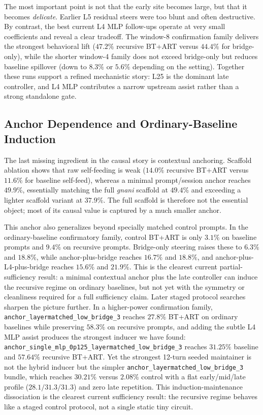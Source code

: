 \documentclass{article}
\begin{document}
The most important point is not that the early site becomes large, but that it becomes
\emph{delicate}. Earlier L5 residual steers were too blunt and often destructive.
By contrast, the best current L4 MLP follow-ups operate at very small coefficients and reveal a
clear tradeoff. The window-8 confirmation family delivers the strongest behavioral lift
($47.2\%$ recursive BT+ART versus $44.4\%$ for bridge-only), while the shorter window-4 family
does not exceed bridge-only but reduces baseline spillover (down to $8.3\%$ or $5.6\%$ depending
on the setting).
Together these runs support a refined mechanistic story:
L25 is the dominant late controller, and L4 MLP contributes a narrow upstream assist rather than a
strong standalone gate.

\subsection{Anchor Dependence and Ordinary-Baseline Induction}
\label{sec:anchor_dependence}

The last missing ingredient in the causal story is contextual anchoring.
Scaffold ablation shows that raw self-feeding is weak
($14.0\%$ recursive BT+ART versus $11.6\%$ for baseline self-feed), whereas a minimal
prompt/session anchor reaches $49.9\%$, essentially matching the full \emph{gnani} scaffold at
$49.4\%$ and exceeding a lighter scaffold variant at $37.9\%$.
The full scaffold is therefore not the essential object; most of its causal value is captured by a
much smaller anchor.

This anchor also generalizes beyond specially matched control prompts.
In the ordinary-baseline confirmatory family, control BT+ART is only $3.1\%$ on baseline prompts
and $9.4\%$ on recursive prompts.
Bridge-only steering raises these to $6.3\%$ and $18.8\%$, while
anchor-plus-bridge reaches $16.7\%$ and $18.8\%$, and
anchor-plus-L4-plus-bridge reaches $15.6\%$ and $21.9\%$.
This is the clearest current partial-sufficiency result:
a minimal contextual anchor plus the late controller can induce the recursive regime on ordinary
baselines, but not yet with the symmetry or cleanliness required for a full sufficiency claim.
Later staged protocol searches sharpen the picture further.
In a higher-power confirmation family, \texttt{anchor\_layermatched\_low\_bridge\_3} reaches
$27.8\%$ BT+ART on ordinary baselines while preserving $58.3\%$ on recursive prompts, and adding
the subtle L4 MLP assist produces the strongest inducer we have found:
\texttt{anchor\_single\_mlp\_0p125\_layermatched\_low\_bridge\_3} reaches
$31.25\%$ baseline and $57.64\%$ recursive BT+ART.
Yet the strongest 12-turn seeded maintainer is not the hybrid inducer but the simpler
\texttt{anchor\_layermatched\_low\_bridge\_3} bundle, which reaches $30.21\%$ versus $2.08\%$
control with a flat early/mid/late profile ($28.1/31.3/31.3$) and zero late repetition.
This induction-maintenance dissociation is the clearest current sufficiency result:
the recursive regime behaves like a staged control protocol, not a single static tiny circuit.
\end{document}
